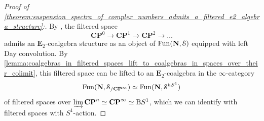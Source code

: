 \documentclass[oneside,a4paper]{amsart}
\begin{document}
\begin{proof}[{Proof of \cref{theorem:suspension_spectra_of_complex_numbers_admits_a_filtered_e2_algebra_structure}:}]
By \cite[{Theorem 5.2.3}]{lurie2015rotation}, the filtered space 
\[
\mathbf{CP}^{0} \rightarrow \mathbf{CP}^{1} \rightarrow \mathbf{CP}^{2} \rightarrow \ldots 
\]
admits an $\mathbf{E}_{2}$-coalgebra structure as an object of $\mathrm{Fun}(\mathbf{N}, \EuScript{S})$ equipped with left Day convolution. By \cref{lemma:coalgebras_in_filtered_spaces_lift_to_coalgebras_in_spaces_over_their_colimit}, this filtered space can be lifted to an $\mathbf{E}_{2}$-coalgebra in the $\infty$-category 
\[
\mathrm{Fun}(\mathbf{N}, \EuScript{S}_{/\mathbf{CP}^{\infty}}) \simeq \mathrm{Fun}(\mathbf{N}, \EuScript{S}^{h S^{1}})
\]
of filtered spaces over $\varinjlim \mathbf{CP}^{n} \simeq \mathbf{CP}^{\infty} \simeq \mathrm{B}S^{1}$, which we can identify with filtered spaces with $S^{1}$-action.  


\end{proof}
\end{document}
